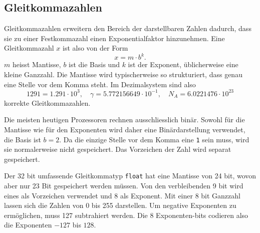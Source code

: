%
%
\subsection{Gleitkommazahlen
\label{buch:subsection:floatinpoing}}
Gleitkommazahlen erweitern den Bereich der darstellbaren Zahlen dadurch,
dass sie zu einer Festkommazahl einen Exponentialfaktor hinzunehmen.
%
%
Eine Gleitkommazahl $x$ ist also von der Form
\[
x = m \cdot b^k.
\]
$m$ heisst Mantisse, $b$ ist die Basis und $k$ ist der
Exponent, üblicherweise eine kleine Ganzzahl.
%
%
%
Die Mantisse wird typischerweise so strukturiert, dass genau eine 
Stelle vor dem Komma steht.
Im Dezimalsystem sind also
\[
1291
=
1.291\cdot 10^{3},
\quad
\gamma = 5.772156649\cdot 10^{-1},
\quad
N_A
=
6.0221476\cdot 10^{23}
\]
korrekte Gleitkommazahlen.

Die meisten heutigen Prozessoren rechnen ausschliesslich binär.
%
Sowohl für die Mantisse wie für den Exponenten wird daher eine
Binärdarstellung verwendet, die Basis ist $b=2$.
Da die einzige Stelle vor dem Komma eine \texttt{1} sein muss, wird
sie normalerweise nicht gespeichert.
Das Vorzeichen der Zahl wird separat gespeichert.
%

Der 32 bit umfassende Gleitkommatyp \texttt{float} hat eine Mantisse
von 24 bit, wovon aber nur 23 Bit gespeichert werden müssen.
%
Von den verbleibenden 9 bit wird eines als Vorzeichen verwendet und
8 als Exponent.
Mit einer 8 bit Ganzzahl lassen sich die Zahlen von 0 bis 255 darstellen.
Um negative Exponenten zu ermöglichen, muss 127 subtrahiert werden.
Die 8 Exponenten-bits codieren also die Exponenten $-127$ bis $128$.

